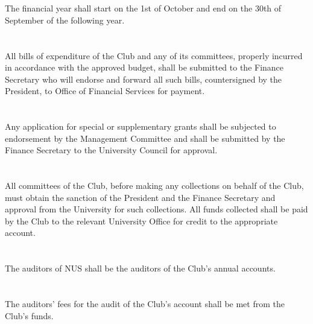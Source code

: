 
\section{}
The financial year shall start on the 1st of October and end on the 30th of September of the following year.

\section{}
All bills of expenditure of the Club and any of its committees, properly incurred in accordance with the approved budget, shall be submitted to the Finance Secretary who will endorse and forward all such bills, countersigned by the President, to Office of Financial Services for payment.

\section{}
Any application for special or supplementary grants shall be subjected to endorsement by the Management Committee and shall be submitted by the Finance Secretary to the University Council for approval.

\section{}
All committees of the Club, before making any collections on behalf of the Club, must obtain the sanction of the President and the Finance Secretary and approval from the University for such collections. All funds collected shall be paid by the Club to the relevant University Office for credit to the appropriate account.

\section{}
The auditors of NUS shall be the auditors of the Club's annual accounts.

\section{}
The auditors' fees for the audit of the Club's account shall be met from the Club's funds.